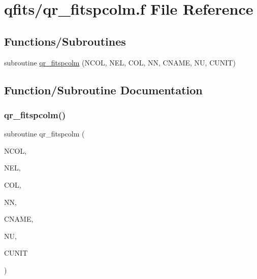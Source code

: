 \hypertarget{qr__fitspcolm_8f}{}\section{qfits/qr\+\_\+fitspcolm.f File Reference}
\label{qr__fitspcolm_8f}
\subsection*{Functions/\+Subroutines}
\begin{DoxyCompactItemize}
\item 
subroutine \hyperlink{qr__fitspcolm_8f_a95c5e740ec6b7933b38a49ac558019d5}{qr\+\_\+fitspcolm} (N\+C\+OL, N\+EL, C\+OL, NN, C\+N\+A\+ME, NU, C\+U\+N\+IT)
\end{DoxyCompactItemize}


\subsection{Function/\+Subroutine Documentation}
\mbox{\label{qr__fitspcolm_8f_a95c5e740ec6b7933b38a49ac558019d5}} 
\subsubsection{\texorpdfstring{qr\+\_\+fitspcolm()}{qr\_fitspcolm()}}
{\footnotesize\ttfamily subroutine qr\+\_\+fitspcolm (\begin{DoxyParamCaption}\item[{integer}]{N\+C\+OL,  }\item[{integer}]{N\+EL,  }\item[{double complex, dimension(nel)}]{C\+OL,  }\item[{integer}]{NN,  }\item[{character$\ast$(nn)}]{C\+N\+A\+ME,  }\item[{integer}]{NU,  }\item[{character$\ast$(nu)}]{C\+U\+N\+IT }\end{DoxyParamCaption})}

